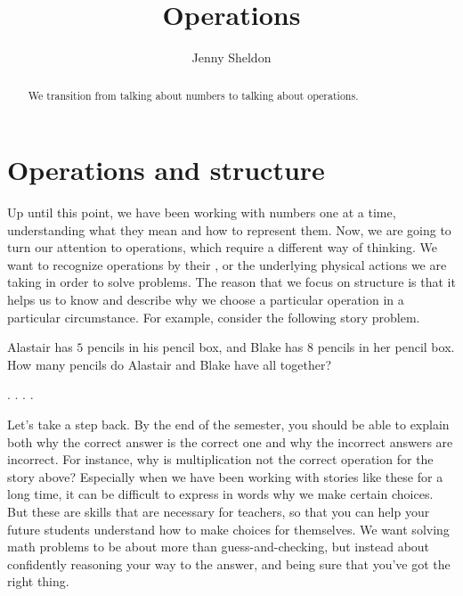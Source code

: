 \documentclass{ximera}
\title{Operations}
\author{Jenny Sheldon}
\begin{document}
\begin{abstract}
We transition from talking about numbers to talking about operations.
\end{abstract}
\maketitle



\section{Operations and structure}


Up until this point, we have been working with numbers one at a time, understanding what they mean and how to represent them. Now, we are going to turn our attention to operations, which require a different way of thinking. We want to recognize operations by their , or the underlying physical actions we are taking in order to solve problems. The reason that we focus on structure is that it helps us to know and describe why we choose a particular operation in a particular circumstance. For example, consider the following story problem.

\begin{question}
Alastair has $5$ pencils in his pencil box, and Blake has $8$ pencils in her pencil box. How many pencils do Alastair and Blake have all together?

\begin{multipleChoice}
.
.
.
.
\end{multipleChoice}
\end{question}

Let's take a step back. By the end of the semester, you should be able to explain both why the correct answer is the correct one and why the incorrect answers are incorrect. For instance, why is multiplication not the correct operation for the story above? Especially when we have been working with stories like these for a long time, it can be difficult to express in words why we make certain choices. But these are skills that are necessary for teachers, so that you can help your future students understand how to make choices for themselves. We want solving math problems to be about more than guess-and-checking, but instead about confidently reasoning your way to the answer, and being sure that you've got the right thing.
\end{document}
